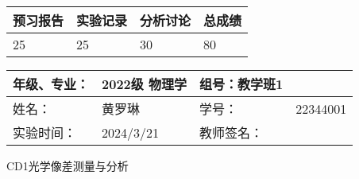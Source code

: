 \documentclass[dvipsnames, svgnames,a4paper,11pt]{article}
\begin{document}
	
	\begin{table}
		\renewcommand\arraystretch{1.7}
		\begin{tabularx}{\textwidth}{
				|X|X|X|X
				|X|X|X|X|}
			\hline
			\multicolumn{2}{|c|}{预习报告}&\multicolumn{2}{|c|}{实验记录}&\multicolumn{2}{|c|}{分析讨论}&\multicolumn{2}{|c|}{总成绩}\\
			\hline
			\LARGE25 & & \LARGE25 & & \LARGE30 & & \LARGE80 & \\
			\hline
		\end{tabularx}
	\end{table}
	
	\begin{table}
		\renewcommand\arraystretch{1.7}
		\begin{tabularx}{\textwidth}{|X|X|X|X|}
			\hline
			年级、专业： & 2022级 物理学 &组号：教学班1 & \\
			\hline
			姓名： & 黄罗琳   & 学号： &22344001   \\
			\hline
			实验时间： & 2024/3/21 & 教师签名： & \\
			\hline
		\end{tabularx}
	\end{table}
	
	\begin{center}
		\LARGE CD1\quad 光学像差测量与分析
	\end{center}
	
	
\end{document}
